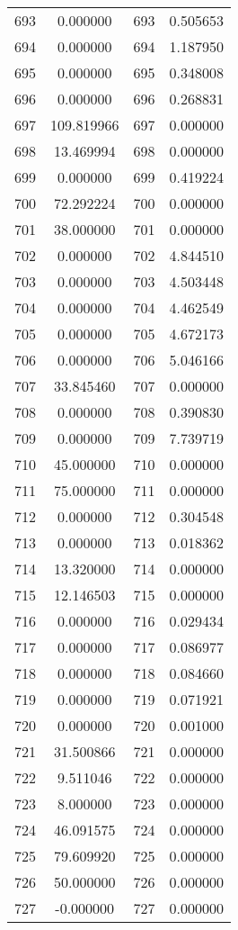 \documentclass[12pt]{article}
\begin{document}
\begin{longtable}{@{}cccc@{}}
693 & 0.000000 & 693 & 0.505653 \\
694 & 0.000000 & 694 & 1.187950 \\
695 & 0.000000 & 695 & 0.348008 \\
696 & 0.000000 & 696 & 0.268831 \\
697 & 109.819966 & 697 & 0.000000 \\
698 & 13.469994 & 698 & 0.000000 \\
699 & 0.000000 & 699 & 0.419224 \\
700 & 72.292224 & 700 & 0.000000 \\
701 & 38.000000 & 701 & 0.000000 \\
702 & 0.000000 & 702 & 4.844510 \\
703 & 0.000000 & 703 & 4.503448 \\
704 & 0.000000 & 704 & 4.462549 \\
705 & 0.000000 & 705 & 4.672173 \\
706 & 0.000000 & 706 & 5.046166 \\
707 & 33.845460 & 707 & 0.000000 \\
708 & 0.000000 & 708 & 0.390830 \\
709 & 0.000000 & 709 & 7.739719 \\
710 & 45.000000 & 710 & 0.000000 \\
711 & 75.000000 & 711 & 0.000000 \\
712 & 0.000000 & 712 & 0.304548 \\
713 & 0.000000 & 713 & 0.018362 \\
714 & 13.320000 & 714 & 0.000000 \\
715 & 12.146503 & 715 & 0.000000 \\
716 & 0.000000 & 716 & 0.029434 \\
717 & 0.000000 & 717 & 0.086977 \\
718 & 0.000000 & 718 & 0.084660 \\
719 & 0.000000 & 719 & 0.071921 \\
720 & 0.000000 & 720 & 0.001000 \\
721 & 31.500866 & 721 & 0.000000 \\
722 & 9.511046 & 722 & 0.000000 \\
723 & 8.000000 & 723 & 0.000000 \\
724 & 46.091575 & 724 & 0.000000 \\
725 & 79.609920 & 725 & 0.000000 \\
726 & 50.000000 & 726 & 0.000000 \\
727 & -0.000000 & 727 & 0.000000 \\

\end{longtable}
\end{document}
